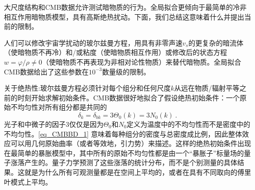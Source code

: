 
大尺度结构和CMB数据允许测试暗物质的行为。全局拟合更倾向于最简单的冷非相互作用暗物质模型，具有高斯绝热扰动。下面，我们总结这意味着什么并提出当前的限制。

人们可以修改宇宙学扰动的玻尔兹曼方程，用具有非零声速$v_s$的更复杂的暗流体（使暗物质不再冷）和/或粘度（使暗物质相互作用）或修改后的状态方程$w = \varphi/\rho \neq 0$（使暗物质不再表现为非相对论性物质）来替代暗物质。全局拟合CMB数据给出了这些参数在$10^{-3}$数量级的限制。

关于绝热性:玻尔兹曼方程必须针对每个组分和任何尺度$k$从远在物质/辐射平等之前的时刻开始求解初始条件。CMB数据很好地拟合了假设绝热初始条件：一个原始不均匀性对所有组分都是共同的
\begin{equation}\label{eq_CMBBD_1}
\delta_k = \delta_{bk} = 3\Theta_0(k) = 3N_0(k)~.
\end{equation}
光子和中微子的因子$3$仅仅是因为$\Theta_0$和$N_0$定义为温度中的不均匀性而不是密度中的不均匀性。\autoref{eq_CMBBD_1} 意味着每种组分的密度与总密度成比例，因此整体效应可以用几何原始曲率（或者等效地，引力势）来描述。这样的绝热初始条件出现在最简单的暴胀模型中，其中所有的原始不均匀性都是由一个“暴胀子”标量场的量子涨落产生的。量子力学预测了这些涨落的统计分布，而不是个别测量的具体结果。这就是为什么所有可观测量都是在空间上平均的，或者在具有不同取向的傅里叶模式上平均。


